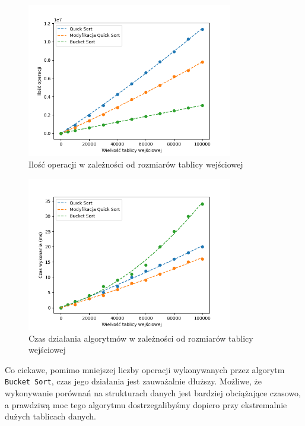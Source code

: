 \documentclass{article}
\begin{document}
\begin{figure}[H]
    \centering
    \includegraphics[width=0.8\textwidth]{Figure_5.png}
    \caption{Ilość operacji w zależności od rozmiarów tablicy wejściowej}
    \label{fig:bucket}
\end{figure}
\begin{figure}[H]
    \centering
    \includegraphics[width=0.8\textwidth]{Figure_6.png}
    \caption{Czas działania algorytmów w zależności od rozmiarów tablicy wejściowej}
    \label{fig:buckett}
\end{figure}
Co ciekawe, pomimo mniejszej liczby operacji wykonywanych przez algorytm \texttt{Bucket Sort}, czas jego działania jest zauważalnie dłuższy. Możliwe, że wykonywanie porównań na strukturach danych jest bardziej obciążające czasowo, a prawdziwą moc tego algorytmu dostrzegalibyśmy dopiero przy ekstremalnie dużych tablicach danych.
\end{document}
